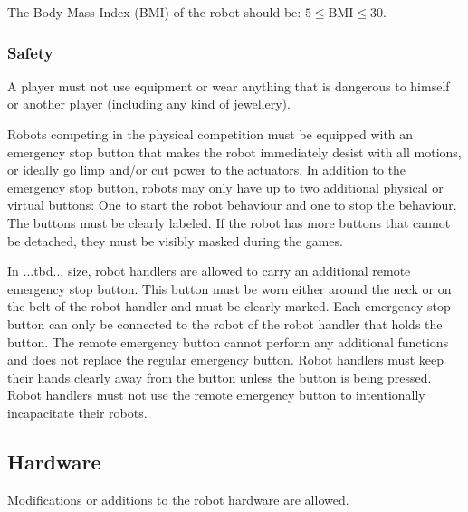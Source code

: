 The Body Mass Index (BMI) of the robot should be: $5 \leq \mathrm{BMI} \leq 30$.

\subsubsection{Safety}

A player must not use equipment or wear anything that is dangerous to himself or another player (including any kind of jewellery).

Robots competing in the physical competition must be equipped with an emergency stop button that makes the robot immediately desist with all motions, 
or ideally go limp and/or cut power to the actuators.
In addition to the emergency stop button, robots may only have up to two additional physical or virtual buttons: One to start the robot behaviour and one to stop the behaviour. 
The buttons must be clearly labeled. If the robot has more buttons that cannot be detached, they must be visibly masked during the games.

In ...tbd... size, robot handlers are allowed to carry an additional remote emergency stop button. 
This button must be worn either around the neck or on the belt of the robot handler and must be clearly marked. 
Each emergency stop button can only be connected to the robot of the robot handler that holds the button.
The remote emergency button cannot perform any additional functions and does not replace the regular emergency button. 
Robot handlers must keep their hands clearly away from the button unless the button is being pressed. 
Robot handlers must not use the remote emergency button to intentionally incapacitate their robots.


\label{sec:design_of_robots}

\subsection{Hardware}
\label{sec:hardware}


Modifications or additions to the robot hardware are allowed.


